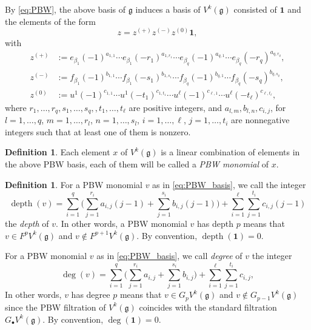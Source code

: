 \documentclass[JEP,XML,SOM,Unicode]{cedram}
\newcommand{\sbullet}{{\scriptscriptstyle\bullet}}
\let\be\beta
\DeclareMathOperator{\dep}{depth}
\newcommand \g{\mathfrak g}
\theoremstyle{definition}
\newtheorem{defn}[theorem]{Definition}
\begin{document}
By \eqref{eq:PBW},
the above basis of $\g$
induces a basis of $V^k(\g)$ consisted of $\mathbf{1}$
and the elements of the form
\begin{equation}
\label{eq:PBW_basis}
z = z^{(+)} z^{(-)} z^{(0)} \mathbf{1},
\end{equation}
with
\begin{align*}
z^{(+)} &:= e_{\be_{1}}(-1)^{a_{1,1}}\cdots
e_{\be_{1}} (- r_1)^{a_{1,r_1}}\cdots
e_{\be_q}(- 1)^{a_{q,1}}\cdots e_{\be_q}(- r_q)^{a_{q,r_q}}, \\
z^{(-)} &:=f_{\be_1}(-1)^{b_{1,1}}\cdots f_{\be_1}(- s_1)^{b_{1,s_1}}\cdots
f_{\be_q}(- 1)^{b_{q,1}}
\cdots f_{\be_q}(- s_q)^{b_{q,s_q}}, \\
z^{(0)} &:= u^1(- 1)^{c_{1,1}}\cdots u^1(- t_1)^{c_{1,t_1}}
\cdots u^\ell (- 1)^{c_{\ell,1}}\cdots u^\ell(- t_\ell)^{c_{\ell, t_\ell}},
\end{align*}
where $r_1,\dots,r_q, s_1,\dots,s_q,,t_1,\dots,t_\ell$
are positive integers, and $a_{l,m},b_{l,n},c_{i,j}$, for $l =1,\dots,q$,
$m=1,\dots,r_l$, $n=1,\dots,s_l$, $i = 1,\dots,\ell$, $j=1,\dots,t_i$
are nonnegative integers such
that at least one of them is nonzero.

\begin{defn}
\label{def:monomial_V}
Each element $x$ of $V^k(\g)$
is a linear combination of elements in the above PBW basis,
each of them will be called a \emph{PBW monomial} of $x$.
\end{defn}

\begin{defn}
\label{def:depth_V}
For a PBW monomial $v$ as in \eqref{eq:PBW_basis},
we call the integer
\begin{equation*}
\dep(v) =\sum_{i=1}^q \biggl(\sum_{j=1}^{r_i}
a_{i,j}(j-1) + \sum_{j=1}^{s_i} b_{i,j} (j-1) \biggr)
+ \sum_{i=1}^\ell \sum_{j=1}^{t_i} c_{i,j}(j-1)
\end{equation*}
the \emph{depth} of $v$.
In other words, a PBW monomial $v$ has depth $p$ means that
$v \in F^{p}V^k(\g)$ and $v \not \in F^{p+1}V^k(\g)$.
By convention, $\dep(\mathbf{1})=0$.

For a PBW monomial $v$ as in \eqref{eq:PBW_basis},
we call \emph{degree} of $v$ the integer
\begin{equation*}
\deg(v) =
\sum_{i=1}^q \biggl(\sum_{j=1}^{r_i}
a_{i,j} + \sum_{j=1}^{s_i} b_{i,j}\biggr)
+ \sum_{i=1}^\ell \sum_{j=1}^{t_i} c_{i,j},
\end{equation*}
In other words, $v$ has degree $p$ means that
$v \in G_{p}V^k(\g)$ and $v \not \in G_{p-1}V^k(\g)$
since the PBW filtration of $V^k(\g)$ coincides with the
standard filtration $G_\sbullet V^k(\g)$.
By convention, $\deg(\mathbf{1})=0$.
\end{defn}
\end{document}
